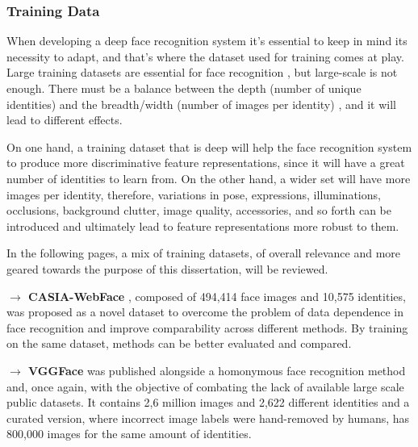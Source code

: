 \documentclass[class=report, crop=false, a4paper, 12pt]{standalone}
\begin{document}
\subsubsection{\large Training Data}
\par When developing a deep face recognition system it's essential to keep in mind its necessity to adapt, and that's where the dataset used for training comes at play. Large training datasets are essential for face recognition \autocite{parkhiDeepFaceRecognition2015}, but large-scale is not enough. There must be a balance between the depth (number of unique identities) and the breadth/width (number of images per identity) \autocite{bansalDonTsCNNbased2017, caoVGGFace2DatasetRecognising2018}, and it will lead to different effects. 
\par On one hand, a training dataset that is deep will help the face recognition system to produce more discriminative feature representations, since it will have a great number of identities to learn from. On the other hand, a wider set will have more images per identity, therefore, variations in pose, expressions, illuminations, occlusions, background clutter, image quality, accessories, and so forth \autocite{baeDigiFace1MMillionDigital2023} can be introduced and ultimately lead to feature representations more robust to them.

\vspace{\baselineskip}
In the following pages, a mix of training datasets, of overall relevance and more geared towards the purpose of this dissertation, will be reviewed.


\vspace{0.7\baselineskip}
\noindent\textbf{$\rightarrow$ CASIA-WebFace} \autocite{yiLearningFaceRepresentation2014}, composed of 494,414 face images and 10,575 identities, was proposed as a novel dataset to overcome the problem of data dependence in face recognition and improve comparability across different methods. By training on the same dataset, methods can be better evaluated and compared.

\vspace{0.7\baselineskip}
\noindent\textbf{$\rightarrow$ VGGFace} \autocite{parkhiDeepFaceRecognition2015} was published alongside a homonymous face recognition method and, once again, with the objective of combating the lack of available large scale public datasets. It contains 2,6 million images and 2,622 different identities and a curated version, where incorrect image labels were hand-removed by humans, has 800,000 images for the same amount of identities.
\end{document}
